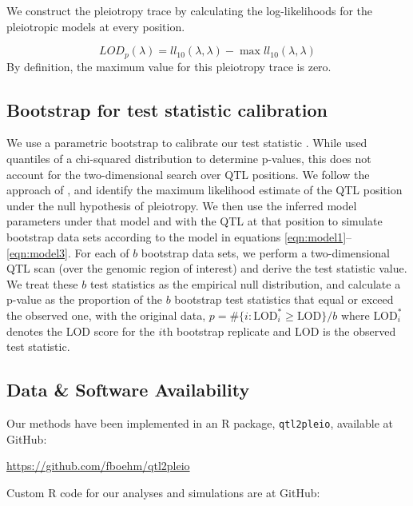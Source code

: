 \documentclass[12pt,twoside, lineno]{gsajnl}
\begin{document}
We construct the pleiotropy trace by calculating the log-likelihoods
for the pleiotropic models at every position.

\begin{equation}
LOD_{p}(\lambda) = ll_{10}(\lambda, \lambda) - \max ll_{10}(\lambda, \lambda)
\label{eq:lodp}
\end{equation}
By definition, the maximum value for this pleiotropy trace
is zero.






\subsection{Bootstrap for test statistic calibration}

We use a parametric bootstrap to calibrate our test statistic
\citep{efron1979}. While \citet{jiang1995multiple} used quantiles of a
chi-squared distribution to determine p-values, this does not account
for the two-dimensional search over QTL positions.
We follow the approach of \citet{tian2016dissection}, and identify
the maximum likelihood estimate of the QTL position under the null
hypothesis of pleiotropy.
We then use the inferred model parameters under that model and with
the QTL at that position to simulate bootstrap data sets according to
the model in equations \ref{eqn:model1}--\ref{eqn:model3}.
For each of $b$ bootstrap data sets, we
perform a two-dimensional QTL scan (over the genomic region of
interest) and derive the test
statistic value. We treat these $b$ test statistics as the
empirical null distribution, and calculate a p-value as the
proportion of the $b$ bootstrap test statistics that equal or exceed
the observed one, with the original data,
$p = \# \{ i:\text{LOD}^*_i \geq \text{LOD}\} / b$
where $\text{LOD}_i^*$ denotes the LOD score for the $i$th bootstrap
replicate and LOD is the observed test statistic.



\subsection{Data \& Software Availability}

Our methods have been implemented in an R package, \texttt{qtl2pleio},
available at GitHub:

\href{https://github.com/fboehm/qtl2pleio}{https://github.com/fboehm/qtl2pleio}

\noindent Custom R code for our analyses and simulations are at GitHub:
\end{document}
